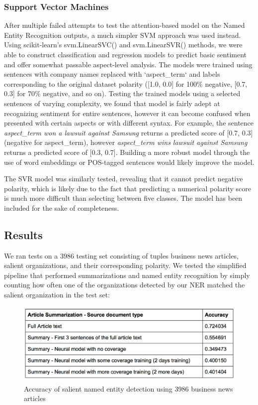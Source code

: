 \documentclass[12pt,a4paper]{article}
\begin{document}
\subsubsection{Support Vector Machines}
After multiple failed attempts to test the attention-based model on the Named Entity Recognition outputs, a much simpler SVM approach was used instead. Using scikit-learn's svm.LinearSVC() and svm.LinearSVR() methods, we were able to construct classification and regression models to predict basic sentiment and offer somewhat passable aspect-level analysis. The models were trained using sentences with company names replaced with `aspect\_term` and labels corresponding to the original dataset polarity ([1.0, 0.0] for 100\% negative, [0.7, 0.3] for 70\% negative, and so on). Testing the trained models using a selected sentences of varying complexity, we found that model is fairly adept at recognizing sentiment for entire sentences, however it can become confused when presented with certain aspects or with different syntax. For example, the sentence \textit{aspect\_term won a lawsuit against Samsung} returns a predicted score of [0.7, 0.3] (negative for aspect\_term), however \textit{aspect\_term wins lawsuit against Samsung} returns a predicted score of [0.3, 0.7]. Building a more robust model through the use of word embeddings or POS-tagged sentences would likely improve the model. 

The SVR model was similarly tested, revealing that it cannot predict negative polarity, which is likely due to the fact that predicting a numerical polarity score is much more difficult than selecting between five classes. The model has been included for the sake of completeness.

\subsection{Results}
We ran tests on a 3986 testing set consisting of tuples  business news articles, salient organizations, and their corresponding polarity. We tested the simplified pipeline that performed summarizations and named entity recognition by simply counting how often one of the organizations detected by our NER matched the salient organization in the test set:

\begin{figure}[H]
  \centering
  \includegraphics[scale=0.6]{results_summarization.png}
  \caption{Accuracy of salient named entity detection using 3986 business news articles}
  \label{fig:network_performance}
\end{figure}
\end{document}
